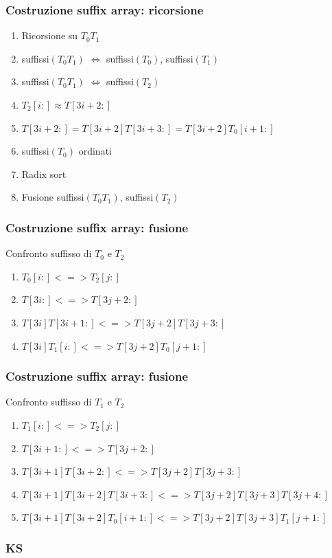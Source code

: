 \begin{frame}
\frametitle{Costruzione suffix array: ricorsione}
\begin{enumerate}
\item
Ricorsione su $T_{0}T_{1}$
\item
suffissi$(T_{0}T_{1})$ $\Leftrightarrow$ suffissi$(T_{0})$, suffissi$(T_{1})$
\item
suffissi$(T_{0}T_{1})$  $\Leftrightarrow$ suffissi$(T_{2})$
\item
$T_{2}[i:] \approx T[3i+2:]$
\item
$T[3i+2:] = T[3i+2]T[3i+3:] =T[3i+2]T_{0}[i+1:]$
\item
suffissi$(T_{0})$ ordinati
\item
Radix sort
\item
Fusione suffissi$(T_{0}T_{1})$,  suffissi$(T_{2})$
\end{enumerate}
\end{frame}

\begin{frame}
\frametitle{Costruzione suffix array: fusione}
Confronto suffisso di $T_{0}$ e $T_{2}$
\begin{enumerate}
\item
$T_{0}[i:] <=> T_{2}[j:]$
\item
$T[3i:] <=> T[3j+2:]$
\item
$T[3i]T[3i+1:] <=> T[3j+2]T[3j+3:]$
\item
$T[3i]T_{1}[i:] <=> T[3j+2]T_{0}[j+1:]$
\end{enumerate}
\end{frame}



\begin{frame}
\frametitle{Costruzione suffix array: fusione}
Confronto suffisso di $T_{1}$ e $T_{2}$
\begin{enumerate}
\item
$T_{1}[i:] <=> T_{2}[j:]$
\item
$T[3i+1:] <=> T[3j+2:]$
\item
$T[3i+1]T[3i+2:] <=> T[3j+2]T[3j+3:]$
\item
$T[3i+1]T[3i+2]T[3i+3:] <=> T[3j+2]T[3j+3]T[3j+4:]$
\item
$T[3i+1]T[3i+2]T_{0}[i+1:] <=> T[3j+2]T[3j+3]T_{1}[j+1:]$
\end{enumerate}
\end{frame}

\begin{frame}
\frametitle{KS}
\end{frame}

